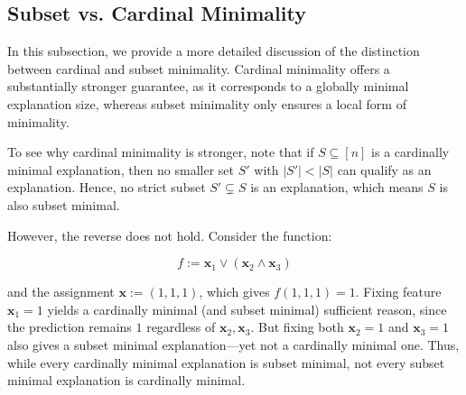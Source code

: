 \documentclass{article}
\newcommand{\x}{\textbf{x}}
\begin{document}
\subsection{Subset vs. Cardinal Minimality}
\label{subset_cardinal_minimality}

In this subsection, we provide a more detailed discussion of the distinction between cardinal and subset minimality. Cardinal minimality offers a substantially stronger guarantee, as it corresponds to a globally minimal explanation size, whereas subset minimality only ensures a local form of minimality.

To see why cardinal minimality is stronger, note that if $S \subseteq [n]$ is a cardinally minimal explanation, then no smaller set $S'$ with $|S'|<|S|$ can qualify as an explanation. Hence, no strict subset $S' \subsetneq S$ is an explanation, which means $S$ is also subset minimal.

However, the reverse does not hold. Consider the function:

\begin{equation}
    f:=\x_1 \vee (\x_2 \wedge \x_3)
\end{equation}


and the assignment $\x := (1,1,1)$, which gives $f(1,1,1)=1$. Fixing feature $\x_1=1$ yields a cardinally minimal (and subset minimal) sufficient reason, since the prediction remains $1$ regardless of $\x_2,\x_3$. But fixing both $\x_2=1$ and $\x_3=1$ also gives a subset minimal explanation—yet not a cardinally minimal one. Thus, while every cardinally minimal explanation is subset minimal, not every subset minimal explanation is cardinally minimal.




\end{document}

